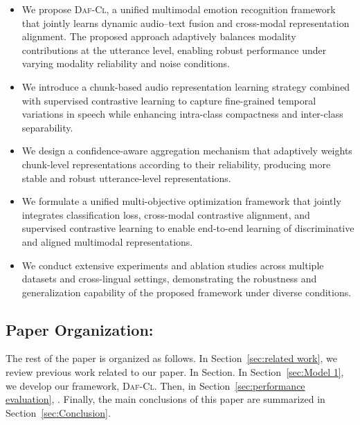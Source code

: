 \begin{itemize}
\item We propose \textsc{Daf-Cl}, a unified multimodal emotion recognition framework that jointly learns dynamic audio–text fusion and cross-modal representation alignment. The proposed approach adaptively balances modality contributions at the utterance level, enabling robust performance under varying modality reliability and noise conditions.
\item We introduce a chunk-based audio representation learning strategy combined with supervised contrastive learning to capture fine-grained temporal variations in speech while enhancing intra-class compactness and inter-class separability.
\item We design a confidence-aware aggregation mechanism that adaptively weights chunk-level representations according to their reliability, producing more stable and robust utterance-level representations.
\item We formulate a unified multi-objective optimization framework that jointly integrates classification loss, cross-modal contrastive alignment, and supervised contrastive learning to enable end-to-end learning of discriminative and aligned multimodal representations.
\item We conduct extensive experiments and ablation studies across multiple datasets and cross-lingual settings, demonstrating the robustness and generalization capability of the proposed framework under diverse conditions.
\end{itemize}

\subsection*{Paper Organization:} The rest of the paper is organized as follows. In Section~\ref{sec:related work}, we review previous work related to our paper. In Section. In Section~\ref{sec:Model 1}, we develop our framework, \textsc{Daf-Cl}. Then, in Section~\ref{sec:performance evaluation}, . Finally, the main conclusions of this paper are summarized in Section~\ref{sec:Conclusion}.


